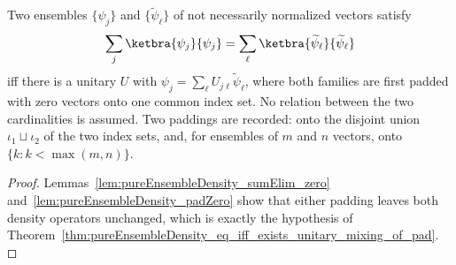\begin{theorem}
    \label{thm:pureEnsembleDensity_eq_iff_exists_unitary_mixing}
    \leanok
    Two ensembles $\{\psi_j\}$ and $\{\widetilde\psi_\ell\}$ of not necessarily
    normalized vectors satisfy
    \begin{align}
        \sum_j \ketbra{\psi_j}{\psi_j}
        = \sum_\ell \ketbra{\widetilde\psi_\ell}{\widetilde\psi_\ell}
    \end{align}
    iff there is a unitary $U$ with
    $\psi_j = \sum_\ell U_{j\ell}\widetilde\psi_\ell$, where both families are
    first padded with zero vectors onto one common index set. No relation
    between the two cardinalities is assumed. Two paddings are recorded: onto
    the disjoint union $\iota_1 \sqcup \iota_2$ of the two index sets, and, for
    ensembles of $m$ and $n$ vectors, onto $\{k : k < \max(m,n)\}$.
\end{theorem}

\begin{proof}
    \leanok
    Lemmas~\ref{lem:pureEnsembleDensity_sumElim_zero}
    and~\ref{lem:pureEnsembleDensity_padZero} show that either padding leaves
    both density operators unchanged, which is exactly the hypothesis of
    Theorem~\ref{thm:pureEnsembleDensity_eq_iff_exists_unitary_mixing_of_pad}.
\end{proof}
